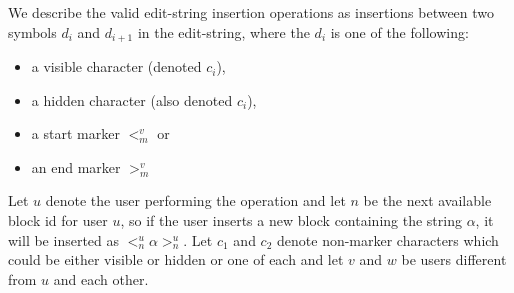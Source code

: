 \documentclass{amsart}
\begin{document}
We describe the valid edit-string insertion operations as insertions
between two symbols $d_i$ and $d_{i+1}$ in the edit-string, where the $d_i$
is one of the following:
\begin{itemize}
\item  a visible character (denoted $c_i$),
\item a hidden character (also denoted $c_i$),
\item  a start marker $<^v_m$ or
\item an end marker $>^v_m$
\end{itemize}
Let $u$ denote the user performing
the operation and let $n$ be the next available block id for user $u$, so if
the user inserts a new block containing the string $\alpha$, it will be inserted
as $<^u_n \alpha >^u_n$.  Let $c_1$ and $c_2$ denote non-marker characters
which could be either visible or hidden or one of each and let
 $v$ and $w$ be users different from $u$ and each other.
\end{document}
